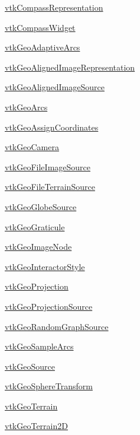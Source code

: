 
\begin{DoxyItemize}
\item \hyperlink{vtkgeovis_vtkcompassrepresentation}{vtk\-Compass\-Representation}  
\item \hyperlink{vtkgeovis_vtkcompasswidget}{vtk\-Compass\-Widget}  
\item \hyperlink{vtkgeovis_vtkgeoadaptivearcs}{vtk\-Geo\-Adaptive\-Arcs}  
\item \hyperlink{vtkgeovis_vtkgeoalignedimagerepresentation}{vtk\-Geo\-Aligned\-Image\-Representation}  
\item \hyperlink{vtkgeovis_vtkgeoalignedimagesource}{vtk\-Geo\-Aligned\-Image\-Source}  
\item \hyperlink{vtkgeovis_vtkgeoarcs}{vtk\-Geo\-Arcs}  
\item \hyperlink{vtkgeovis_vtkgeoassigncoordinates}{vtk\-Geo\-Assign\-Coordinates}  
\item \hyperlink{vtkgeovis_vtkgeocamera}{vtk\-Geo\-Camera}  
\item \hyperlink{vtkgeovis_vtkgeofileimagesource}{vtk\-Geo\-File\-Image\-Source}  
\item \hyperlink{vtkgeovis_vtkgeofileterrainsource}{vtk\-Geo\-File\-Terrain\-Source}  
\item \hyperlink{vtkgeovis_vtkgeoglobesource}{vtk\-Geo\-Globe\-Source}  
\item \hyperlink{vtkgeovis_vtkgeograticule}{vtk\-Geo\-Graticule}  
\item \hyperlink{vtkgeovis_vtkgeoimagenode}{vtk\-Geo\-Image\-Node}  
\item \hyperlink{vtkgeovis_vtkgeointeractorstyle}{vtk\-Geo\-Interactor\-Style}  
\item \hyperlink{vtkgeovis_vtkgeoprojection}{vtk\-Geo\-Projection}  
\item \hyperlink{vtkgeovis_vtkgeoprojectionsource}{vtk\-Geo\-Projection\-Source}  
\item \hyperlink{vtkgeovis_vtkgeorandomgraphsource}{vtk\-Geo\-Random\-Graph\-Source}  
\item \hyperlink{vtkgeovis_vtkgeosamplearcs}{vtk\-Geo\-Sample\-Arcs}  
\item \hyperlink{vtkgeovis_vtkgeosource}{vtk\-Geo\-Source}  
\item \hyperlink{vtkgeovis_vtkgeospheretransform}{vtk\-Geo\-Sphere\-Transform}  
\item \hyperlink{vtkgeovis_vtkgeoterrain}{vtk\-Geo\-Terrain}  
\item \hyperlink{vtkgeovis_vtkgeoterrain2d}{vtk\-Geo\-Terrain2\-D}  

\end{DoxyItemize}
